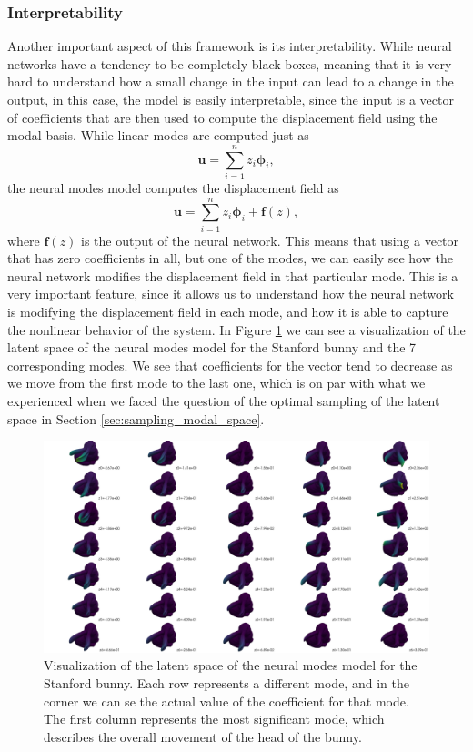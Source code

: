 \subsubsection{Interpretability}
Another important aspect of this framework is its interpretability. While neural networks have a tendency to be completely black boxes, meaning that it is very hard to understand how a small change in the input can lead to a change in the output, in this case, the model is easily interpretable, since the input is a vector of coefficients that are then used to compute the displacement field using the modal basis. While linear modes are computed just as 
\begin{equation*}
    \bm{u} = \sum_{i=1}^n z_i \bm{\phi}_i,
    \end{equation*}
    the neural modes model computes the displacement field as
    \begin{equation*}
    \bm{u} = \sum_{i=1}^n z_i \bm{\phi}_i + \bm{f}(z),
    \end{equation*}
    where $\bm{f}(z)$ is the output of the neural network. This means that using a vector that has zero coefficients in all, but one of the modes, we can easily see how the neural network modifies the displacement field in that particular mode. This is a very important feature, since it allows us to understand how the neural network is modifying the displacement field in each mode, and how it is able to capture the nonlinear behavior of the system. 
    In Figure \ref{fig:latent_space_viz} we can see a visualization of the latent space of the neural modes model for the Stanford bunny and the 7 corresponding modes. We see that coefficients for the vector tend to decrease as we move from the first mode to the last one, which is on par with what we experienced when we faced the question of the optimal sampling of the latent space in Section \ref{sec:sampling_modal_space}.

\begin{figure}[H]
    \centering
    \includegraphics[width=\textwidth]{Images/latent_space_viz.png}
    \caption{Visualization of the latent space of the neural modes model for the Stanford bunny. Each row represents a different mode, and in the corner we can se the actual value of the coefficient for that mode. The first column represents the most significant mode, which describes the overall movement of the head of the bunny.}
    \label{fig:latent_space_viz}
    \end{figure}
    

